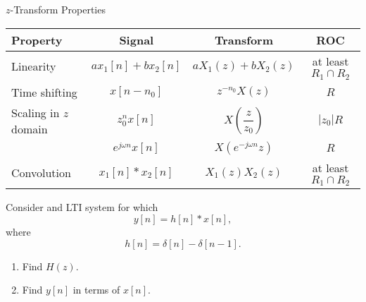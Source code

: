 \begin{frame}{$z$-Transform Properties}
    \begin{center}
        \begin{tabular}{lccc}
            \hline
            Property & Signal & Transform & ROC\\
            \hline
            Linearity & $ax_1[n] + bx_2[n]$ & $aX_1(z) + bX_2(z)$ & at least $R_1 \cap R_2$\\
            Time shifting & $x[n-n_0]$ & $z^{-n_0}X(z)$ & $R$\\
            Scaling in $z$ domain & $z_0^{n}x[n]$ & $X\left(\dfrac{z}{z_0}\right)$ & $|z_0|R$\\
             & $e^{j \omega n}x[n] $ & $X(e^{-j \omega n}z)$ & $R$\\
            Convolution &$x_1[n]\ast x_2[n]$ & $X_1(z)X_2(z)$ & at least $R_1 \cap R_2$\\
            \hline
        \end{tabular}
    \end{center}

\end{frame}

\begin{frame}
    \begin{example}
        Consider and LTI system for which
        \begin{equation*}
            y[n] = h[n]\ast x[n],
        \end{equation*}
        where
        \begin{equation*}
            h[n] = \delta[n] - \delta[n-1].
        \end{equation*}

        \begin{enumerate}
            \item Find $H(z)$.
            \item Find $y[n]$ in terms of $x[n]$.
        \end{enumerate}

    \end{example}
\end{frame}


